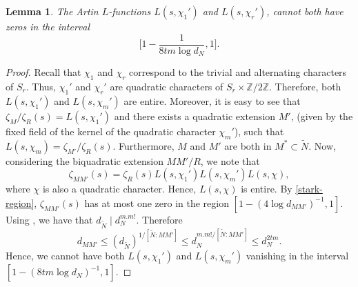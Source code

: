 \documentclass[12pt]{amsart}
\newtheorem{lemma}[theorem]{Lemma}
\theoremstyle{definition}
\newcommand{\Q}{\mathbb{Q}}
\newcommand{\Z}{\mathbb{Z}}
\begin{document}
\begin{lemma}\label{both-zeros}
 The Artin $L$-functions $L(s,\chi_1')$ and $L(s,\chi_r')$, cannot both have zeros in the interval 
 \begin{equation*}
     \bigg[1-\frac{1}{8tm\log d_N},1\bigg].
 \end{equation*}
\end{lemma}
\begin{proof}
    Recall that $\chi_1$ and $\chi_r$ correspond to the trivial and alternating characters of $S_r$. Thus, $\chi_1'$ and $\chi_r'$ are quadratic characters of $S_r\times \Z/2\Z$. Therefore, both $L(s,\chi_1')$ and $L(s,\chi_m')$ are entire. Moreover, it is easy to see that $\zeta_{M}/\zeta_R(s) = L(s,\chi_1')$ and there exists a quadratic extension $M'$, (given by the fixed field of the kernel of the quadratic character $\chi_m'$), such that $L(s,\chi_m) = \zeta_{M'}/\zeta_R(s)$. Furthermore, $M$ and $M'$ are both in $M^*\subset\widetilde{N}$. Now, considering the biquadratic extension $MM'/R$, we note that
    \begin{equation*}
        \zeta_{MM'}(s) = \zeta_R(s) L(s,\chi_1') L(s,\chi_m') L(s,\chi),
    \end{equation*}
    where $\chi$ is also a quadratic character. Hence, $L(s,\chi)$ is entire. By \eqref{stark-region}, $\zeta_{MM'}(s)$ has at most one zero in the region $[1-(4\log d_{MM'})^{-1},1]$. Using \cite[Lemma 7]{Stk}, we have that $d_{\widetilde{N}} \mid d_N^{m.m!}$. Therefore 
    \begin{equation*}
        d_{MM'} \leq (d_{\widetilde{N}})^{1/[\widetilde{N}: MM']}\leq d_N^{m.m!/[\widetilde{N}: MM']} \leq d_N^{2tm}.
    \end{equation*} 
    Hence,  we cannot have both $L(s,\chi_1')$ and $L(s,\chi_m')$ vanishing in the interval $[1-(8tm\log d_N)^{-1},1]$.
\end{proof}
\end{document}
